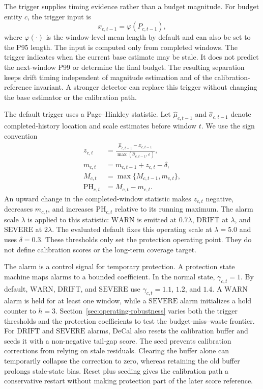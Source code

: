 \documentclass[sigplan,10pt, anonymous]{acmart}
\begin{document}
The trigger supplies timing evidence rather than a budget magnitude. For budget entity $c$, the trigger input is
\begin{equation}
\label{eq:trigger_input}
x_{c,t-1}=\varphi(P_{c,t-1}),
\end{equation}
where $\varphi(\cdot)$ is the window-level mean length by default and can also be set to the P95 length. The input is computed only from completed windows. The trigger indicates when the current base estimate may be stale. It does not predict the next-window P99 or determine the final budget. The resulting separation keeps drift timing independent of magnitude estimation and of the calibration-reference invariant. A stronger detector can replace this trigger without changing the base estimator or the calibration path.

The default trigger uses a Page--Hinkley statistic. Let $\hat{\mu}_{c,t-1}$ and $\hat{\sigma}_{c,t-1}$ denote completed-history location and scale estimates before window $t$. We use the sign convention
\begin{equation}
\label{eq:page_hinkley}
\begin{aligned}
z_{c,t} &=
\frac{\hat{\mu}_{c,t-1}-x_{c,t-1}}
{\max(\hat{\sigma}_{c,t-1},\epsilon)}, \\
m_{c,t} &= m_{c,t-1}+z_{c,t}-\delta, \\
M_{c,t} &= \max\{M_{c,t-1},m_{c,t}\}, \\
\mathrm{PH}_{c,t} &= M_{c,t}-m_{c,t} .
\end{aligned}
\end{equation}
An upward change in the completed-window statistic makes $z_{c,t}$ negative, decreases $m_{c,t}$, and increases $\mathrm{PH}_{c,t}$ relative to its running maximum. The alarm scale $\lambda$ is applied to this statistic: $\text{WARN}$ is emitted at $0.7\lambda$, $\text{DRIFT}$ at $\lambda$, and $\text{SEVERE}$ at $2\lambda$. The evaluated default fixes this operating scale at $\lambda=5.0$ and uses $\delta=0.3$. These thresholds only set the protection operating point. They do not define calibration scores or the long-term coverage target.

The alarm is a control signal for temporary protection. A protection state machine maps alarms to a bounded coefficient. In the normal state, $\gamma_{c,t}=1$. By default, $\text{WARN}$, $\text{DRIFT}$, and $\text{SEVERE}$ use $\gamma_{c,t}=1.1$, $1.2$, and $1.4$. A $\text{WARN}$ alarm is held for at least one window, while a $\text{SEVERE}$ alarm initializes a hold counter to $h=3$. Section~\ref{sec:operating-robustness} varies both the trigger thresholds and the protection coefficients to test the budget-miss--waste frontier. For $\text{DRIFT}$ and $\text{SEVERE}$ alarms, DeCal also resets the calibration buffer and seeds it with a non-negative tail-gap score. The seed prevents calibration corrections from relying on stale residuals. Clearing the buffer alone can temporarily collapse the correction to zero, whereas retaining the old buffer prolongs stale-state bias. Reset plus seeding gives the calibration path a conservative restart without making protection part of the later score reference.
\end{document}
